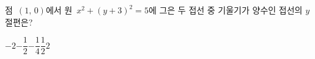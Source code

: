점~$(1,\,0)$에서 원~$x^2+(y+3)^2=5$에 그은 두 접선 중 기울기가 양수인 접선의 $y$절편은?
\begin{choices32}{$-2$}{$-\dfrac{1}{2}$}{$-\dfrac{1}{4}$}{$\dfrac{1}{2}$}{$2$}\end{choices32}
